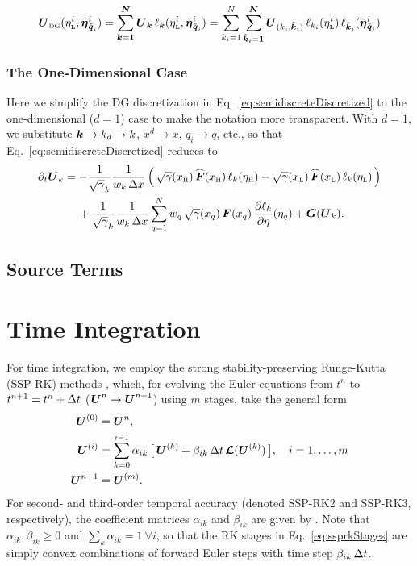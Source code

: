 \documentclass[10pt,preprint]{aastex}
\begin{document}
\begin{equation}
  \boldsymbol{U}_{\mbox{\tiny DG}}(\eta_{\mbox{\tiny L}}^{i},\tilde{\boldsymbol{\eta}}_{\tilde{\boldsymbol{q}}_{i}}^{i})
  =\sum_{\boldsymbol{k}=\boldsymbol{1}}^{\boldsymbol{N}}\boldsymbol{U}_{\boldsymbol{k}}\,\ell_{\boldsymbol{k}}(\eta_{\mbox{\tiny L}}^{i},\tilde{\boldsymbol{\eta}}_{\tilde{\boldsymbol{q}}_{i}}^{i})
  =\sum_{k_{i}=1}^{N}\sum_{\tilde{\boldsymbol{k}}_{i}=\boldsymbol{1}}^{\boldsymbol{N}}\boldsymbol{U}_{(k_{i},\tilde{\boldsymbol{k}}_{i})}\,\ell_{k_{i}}(\eta_{\mbox{\tiny L}}^{i})\,\ell_{\tilde{\boldsymbol{k}}_{i}}(\tilde{\boldsymbol{\eta}}_{\tilde{\boldsymbol{q}}_{i}}^{i})
\end{equation}

\subsubsection{The One-Dimensional Case}

Here we simplify the DG discretization in Eq.~\eqref{eq:semidiscreteDiscretized} to the one-dimensional ($d=1$) case to make the notation more transparent.  
With $d=1$, we substitute $\boldsymbol{k}\to k_{d}\to k$, $x^{d}\to x$, $q_{i}\to q$, etc., so that Eq.~\eqref{eq:semidiscreteDiscretized} reduces to
\begin{align}
  \partial_{t}{}\boldsymbol{U}_{k}
  &=-\frac{1}{\sqrt{\gamma}_{k}}
  \frac{1}{w_{k}\,\Delta x}\,
  \Big(\,
    \sqrt{\gamma}(x_{\mbox{\tiny H}})\,\widehat{\boldsymbol{F}}(x_{\mbox{\tiny H}})\,\ell_{k}(\eta_{\mbox{\tiny H}})
    -\sqrt{\gamma}(x_{\mbox{\tiny L}})\,\widehat{\boldsymbol{F}}(x_{\mbox{\tiny L}})\,\ell_{k}(\eta_{\mbox{\tiny L}})
  \,\Big) \nonumber \\
  & \hspace{12pt}
  +\frac{1}{\sqrt{\gamma}_{k}}
  \frac{1}{w_{k}\,\Delta x}\sum_{q=1}^{N}w_{q}\,\sqrt{\gamma}(x_{q})\,\boldsymbol{F}(x_{q})\,\frac{\partial \ell_{k}}{\partial \eta}(\eta_{q})
  +\boldsymbol{G}(\boldsymbol{U}_{k}).
  \label{eq:semidiscreteDiscretized1D}
\end{align}

\subsection{Source Terms}
\label{sec:sourceTerms}

\section{Time Integration}
\label{sec:TimeIntegration}

For time integration, we employ the strong stability-preserving Runge-Kutta (SSP-RK) methods \citep[e.g.,][]{gottlieb_etal_2001}, which, for evolving the Euler equations from $t^{n}$ to $t^{n+1}=t^{n}+\Delta t$ ($\boldsymbol{U}^{n}\to\boldsymbol{U}^{n+1}$) using $m$ stages, take the general form
\begin{align}
  \boldsymbol{U}^{(0)}
  &=\boldsymbol{U}^{n}, \\
  \boldsymbol{U}^{(i)}
  &=\sum_{k=0}^{i-1}\alpha_{ik}\,\big[\,\boldsymbol{U}^{(k)}+\beta_{ik}\,\Delta t\,\boldsymbol{\mathcal{L}}(\boldsymbol{U}^{(k)})\,\big], \quad i=1,\ldots,m 
  \label{eq:ssprkStages} \\
  \boldsymbol{U}^{n+1}
  &=\boldsymbol{U}^{(m)}.  
\end{align}
For second- and third-order temporal accuracy (denoted SSP-RK2 and SSP-RK3, respectively), the coefficient matrices $\alpha_{ik}$ and $\beta_{ik}$ are given by \citep{shuOsher_1988}.  
Note that $\alpha_{ik},\beta_{ik}\ge0$ and $\sum_{k}\alpha_{ik}=1~\forall i$, so that the RK stages in Eq.~\eqref{eq:ssprkStages} are simply convex combinations of forward Euler steps with time step $\beta_{ik}\,\Delta t$.  
\end{document}

